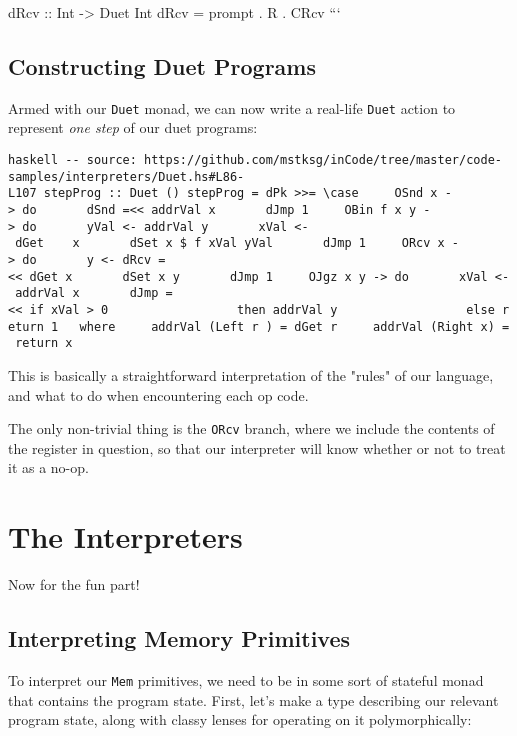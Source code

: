 \documentclass[]{article}
\begin{document}
dRcv :: Int -\textgreater{} Duet Int dRcv = prompt . R . CRcv ```

\subsection{Constructing Duet Programs}

Armed with our \texttt{Duet} monad, we can now write a real-life \texttt{Duet}
action to represent \emph{one step} of our duet programs:

\texttt{haskell\ -\/-\ source:\ https://github.com/mstksg/inCode/tree/master/code-samples/interpreters/Duet.hs\#L86-L107\ stepProg\ ::\ Duet\ ()\ stepProg\ =\ dPk\ \textgreater{}\textgreater{}=\ \textbackslash{}case\ \ \ \ \ OSnd\ x\ -\textgreater{}\ do\ \ \ \ \ \ \ dSnd\ =\textless{}\textless{}\ addrVal\ x\ \ \ \ \ \ \ dJmp\ 1\ \ \ \ \ OBin\ f\ x\ y\ -\textgreater{}\ do\ \ \ \ \ \ \ yVal\ \textless{}-\ addrVal\ y\ \ \ \ \ \ \ xVal\ \textless{}-\ dGet\ \ \ \ x\ \ \ \ \ \ \ dSet\ x\ \$\ f\ xVal\ yVal\ \ \ \ \ \ \ dJmp\ 1\ \ \ \ \ ORcv\ x\ -\textgreater{}\ do\ \ \ \ \ \ \ y\ \textless{}-\ dRcv\ =\textless{}\textless{}\ dGet\ x\ \ \ \ \ \ \ dSet\ x\ y\ \ \ \ \ \ \ dJmp\ 1\ \ \ \ \ OJgz\ x\ y\ -\textgreater{}\ do\ \ \ \ \ \ \ xVal\ \textless{}-\ addrVal\ x\ \ \ \ \ \ \ dJmp\ =\textless{}\textless{}\ if\ xVal\ \textgreater{}\ 0\ \ \ \ \ \ \ \ \ \ \ \ \ \ \ \ \ \ then\ addrVal\ y\ \ \ \ \ \ \ \ \ \ \ \ \ \ \ \ \ \ else\ return\ 1\ \ \ where\ \ \ \ \ addrVal\ (Left\ r\ )\ =\ dGet\ r\ \ \ \ \ addrVal\ (Right\ x)\ =\ return\ x}

This is basically a straightforward interpretation of the "rules" of our
language, and what to do when encountering each op code.

The only non-trivial thing is the \texttt{ORcv} branch, where we include the
contents of the register in question, so that our interpreter will know whether
or not to treat it as a no-op.

\section{The Interpreters}

Now for the fun part!

\subsection{Interpreting Memory Primitives}

To interpret our \texttt{Mem} primitives, we need to be in some sort of stateful
monad that contains the program state. First, let's make a type describing our
relevant program state, along with classy lenses for operating on it
polymorphically:
\end{document}
